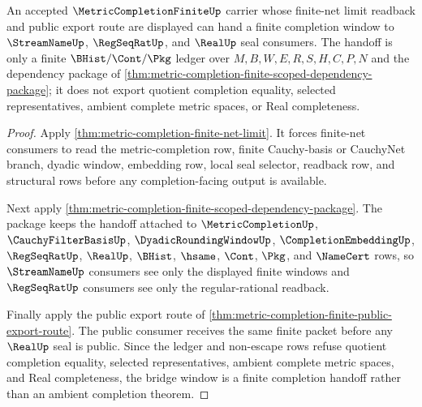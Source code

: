 \begin{theorem}
\label{thm:metric-completion-finite-bridge-window}
An accepted $\MetricCompletionFiniteUp$ carrier whose finite-net limit readback and public export route are displayed can hand a finite completion window to $\StreamNameUp$, $\RegSeqRatUp$, and $\RealUp$ seal consumers. The handoff is only a finite $\BHist/\Cont/\Pkg$ ledger over $M,B,W,E,R,S,H,C,P,N$ and the dependency package of \autoref{thm:metric-completion-finite-scoped-dependency-package}; it does not export quotient completion equality, selected representatives, ambient complete metric spaces, or Real completeness.
\end{theorem}
\begin{proof}
Apply \autoref{thm:metric-completion-finite-net-limit}. It forces finite-net consumers to read the metric-completion row, finite Cauchy-basis or CauchyNet branch, dyadic window, embedding row, local seal selector, readback row, and structural rows before any completion-facing output is available.

Next apply \autoref{thm:metric-completion-finite-scoped-dependency-package}. The package keeps the handoff attached to $\MetricCompletionUp$, $\CauchyFilterBasisUp$, $\DyadicRoundingWindowUp$, $\CompletionEmbeddingUp$, $\RegSeqRatUp$, $\RealUp$, $\BHist$, $\hsame$, $\Cont$, $\Pkg$, and $\NameCert$ rows, so $\StreamNameUp$ consumers see only the displayed finite windows and $\RegSeqRatUp$ consumers see only the regular-rational readback.

Finally apply the public export route of \autoref{thm:metric-completion-finite-public-export-route}. The public consumer receives the same finite packet before any $\RealUp$ seal is public. Since the ledger and non-escape rows refuse quotient completion equality, selected representatives, ambient complete metric spaces, and Real completeness, the bridge window is a finite completion handoff rather than an ambient completion theorem.
\end{proof}

